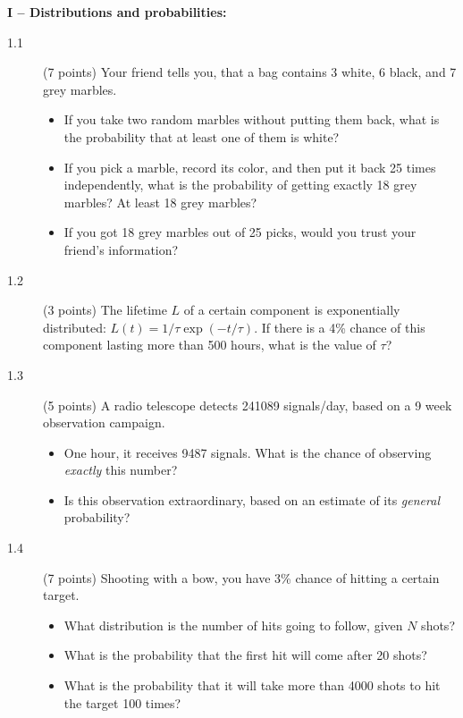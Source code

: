 \documentclass[11pt]{article}
\begin{document}
\vspace{4ex}
\noindent
{\bf I -- Distributions and probabilities:}
\begin{description}
  \item[1.1] (7 points)
  Your friend tells you, that a bag contains 3 white, 6 black, and 7 grey marbles.
  \vspace*{-1ex}
  \begin{itemize}
  \item If you take two random marbles without putting them back, what is the probability that at
    least one of them is white?
    \item If you pick a marble, record its color, and then put it back 25 times independently,
      what is the probability of getting exactly 18 grey marbles? At least 18 grey marbles?
    \item If you got 18 grey marbles out of 25 picks, would you trust your friend's information?
  \end{itemize}
%
  \item[1.2] (3 points)
    The lifetime $L$ of a certain component is exponentially distributed: $L(t) = 1/\tau \exp(-t/\tau)$.
    If there is a 4\% chance of this component lasting more than 500 hours, what is the value of $\tau$?
%
  \item[1.3] (5 points)
   A radio telescope detects 241089 signals/day, based on a 9 week observation campaign.
   \vspace*{-4ex}
   \begin{itemize}
     \item One hour, it receives 9487 signals. What is the chance of observing \emph{exactly} this number?
     \item Is this observation extraordinary, based on an estimate of its \emph{general} probability?
   \end{itemize}
%
  \item[1.4] (7 points)
  Shooting with a bow, you have 3\% chance of hitting a certain target.
  \vspace*{-1ex}
  \begin{itemize}
    \item What distribution is the number of hits going to follow, given $N$ shots?
    \item What is the probability that the first hit will come after 20 shots?
    \item What is the probability that it will take more than 4000 shots to hit the target 100 times?
  \end{itemize}
\end{description}
\end{document}
